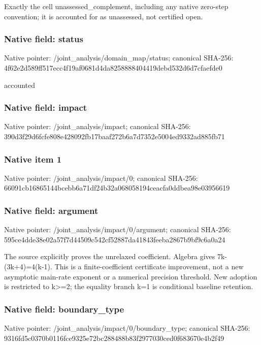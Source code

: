 \documentclass[10pt,a4paper]{article}
\begin{document}
\begingroup\raggedright\sloppy Exactly the cell unassessed\_\allowbreak{}complement,\allowbreak{} including any native zero-step convention;\allowbreak{} it is accounted for as unassessed,\allowbreak{} not certified open.\par\endgroup

\subsubsection{Native field: status}
Native pointer: /joint\_\allowbreak{}analysis/domain\_\allowbreak{}map/status; canonical SHA-256: 4f62e2d589ff517ecc4f19af0681d4da8258888404419debd532d6d7cfaefde0

\begingroup\raggedright\sloppy accounted\par\endgroup

\subsubsection{Native field: impact}
Native pointer: /joint\_\allowbreak{}analysis/impact; canonical SHA-256: 390d3f29d6fcfe808e428092fb17baaf272b6a7d7352e5004ed9332ad885fb71

\subsubsection{Native item 1}
Native pointer: /joint\_\allowbreak{}analysis/impact/0; canonical SHA-256: 66091cb16865144bcebb6a71df24b32a068058194ceacfa0ddbea98e03956619

\subsubsection{Native field: argument}
Native pointer: /joint\_\allowbreak{}analysis/impact/0/argument; canonical SHA-256: 595ce4dde38e02a57f7d44509c542cf52887da41843feeba2867b9bf9c6a0a24

\begingroup\raggedright\sloppy The source explicitly proves the unrelaxed coefficient. Algebra gives 7k-(3k+4)=\allowbreak{}4(k-1). This is a finite-coefficient certificate improvement,\allowbreak{} not a new asymptotic main-rate exponent or a numerical precision threshold. New adoption is restricted to k>=\allowbreak{}2;\allowbreak{} the equality branch k=\allowbreak{}1 is conditional baseline retention.\par\endgroup

\subsubsection{Native field: boundary\_\allowbreak{}type}
Native pointer: /joint\_\allowbreak{}analysis/impact/0/boundary\_\allowbreak{}type; canonical SHA-256: 9316fd5c0370b0116fce9325e72bc288488b83f2977030ced0f683670e4b2f49
\end{document}
